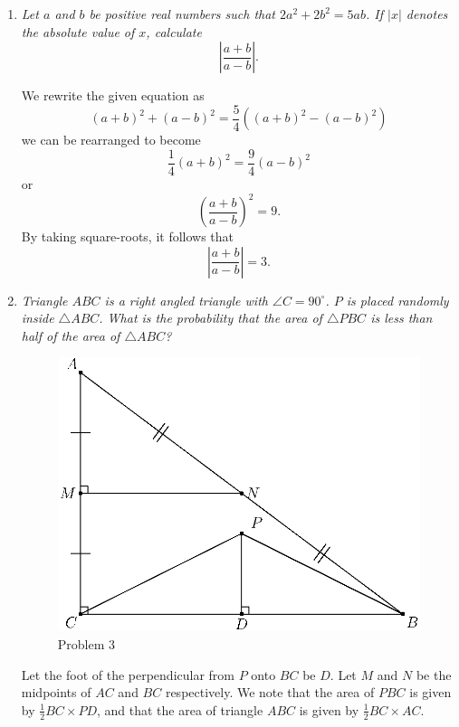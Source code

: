 \documentclass{article}
\begin{document}
\begin{enumerate}[1.]
\vspace{6pt}
\item %
{\itshape Let $a$ and $b$ be positive real numbers such that $2a^2 +2b^2 = 5ab$.
If $|x|$ denotes the absolute value of $x$, calculate
\[ \left|\frac{a+b}{a-b}\right|. \]}

We rewrite the given equation as
\[
	(a + b)^2 + (a - b)^2 = \frac{5}{4} \left( (a + b)^2 - (a - b)^2 \right)	
\]
we can be rearranged to become
\[
	\frac{1}{4} (a + b)^2 = \frac{9}{4} (a - b)^2	
\]
or
\[
	\left( \frac{a + b}{a - b} \right)^2 = 9.
\]
By taking square-roots, it follows that
\[
	\left| \frac{a + b}{a - b} \right| = 3.	
\]



\vspace{6pt}
\item %
{\itshape Triangle $ABC$ is a right angled triangle with $\angle C = 90^{\circ}$. $P$ is placed randomly inside $\triangle ABC$. What is the probability that the area of $\triangle PBC$ is less than half of the area of $\triangle ABC$?}

\begin{figure}[!ht]
	\centering
	\includegraphics{intermediate_february_problem4.eps}
	\caption{Problem 3}
\end{figure}

Let the foot of the perpendicular from $P$ onto $BC$ be $D$. Let $M$ and $N$ be the midpoints of $AC$ and $BC$ respectively. We note that the area of $PBC$ is given by $\frac{1}{2} BC \times PD$, and that the area of triangle $ABC$ is given by $\frac{1}{2} BC \times AC$.


\end{enumerate}
\end{document}
